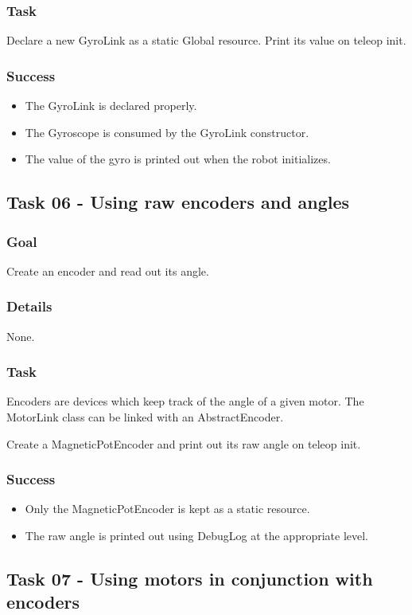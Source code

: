 \documentclass[a4paper]{article}
\begin{document}
\subsubsection{Task} Declare a new GyroLink as a static Global resource. Print its value on teleop init.
\subsubsection{Success}\begin{itemize}\item{The GyroLink is declared properly.}\item{The Gyroscope is consumed by the GyroLink constructor.}\item{The value of the gyro is printed out when the robot initializes.}\end{itemize}

\subsection{Task 06 - Using raw encoders and angles}
\subsubsection{Goal} Create an encoder and read out its angle.
\subsubsection{Details} None.
\subsubsection{Task} Encoders are devices which keep track of the angle of a given motor. The MotorLink class can be linked with an AbstractEncoder.

Create a MagneticPotEncoder and print out its raw angle on teleop init.
\subsubsection{Success} \begin{itemize}\item{Only the MagneticPotEncoder is kept as a static resource.}\item{The raw angle is printed out using DebugLog at the appropriate level.}\end{itemize}

\subsection{Task 07 - Using motors in conjunction with encoders}
\end{document}
